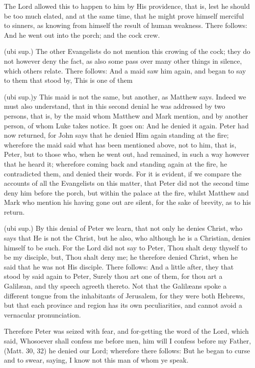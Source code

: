  The Lord allowed this to happen to him by His providence, that is, lest he should be too much elated, and at the same time, that he might prove himself merciful to sinners, as knowing from himself the result of human weakness. There follows: And he went out into the porch; and the cock crew.

 (ubi sup.) The other Evangelists do not mention this crowing of the cock; they do not however deny the fact, as also some pass over many other things in silence, which others relate. There follows: And a maid saw him again, and began to say to them that stood by, This is one of them

 (ubi sup.)y This maid is not the same, but another, as Matthew says. Indeed we must also understand, that in this second denial he was addressed by two persons, that is, by the maid whom Matthew and Mark mention, and by another person, of whom Luke takes notice. It goes on: And he denied it again. Peter had now returned, for John says that he denied Him again standing at the fire; wherefore the maid said what has been mentioned above, not to him, that is, Peter, but to those who, when he went out, had remained, in such a way however that he heard it; wherefore coming back and standing again at the fire, he contradicted them, and denied their words. For it is evident, if we compare the accounts of all the Evangelists on this matter, that Peter did not the second time deny him before the porch, but within the palace at the fire, whilst Matthew and Mark who mention his having gone out are silent, for the sake of brevity, as to his return.

 (ubi sup.) By this denial of Peter we learn, that not only he denies Christ, who says that He is not the Christ, but he also, who although he is a Christian, denies himself to be such. For the Lord did not say to Peter, Thou shalt deny thyself to be my disciple, but, Thou shalt deny me; he therefore denied Christ, when he said that he was not His disciple. There follows: And a little after, they that stood by said again to Peter, Surely thou art one of them, for thou art a Galilæan, and thy speech agreeth thereto. Not that the Galilæans spoke a different tongue from the inhabitants of Jerusalem, for they were both Hebrews, but that each province and region has its own peculiarities, and cannot avoid a vernacular pronunciation.

 Therefore Peter was seized with fear, and for-getting the word of the Lord, which said, Whosoever shall confess me before men, him will I confess before my Father, (Matt. 30, 32) he denied our Lord; wherefore there follows: But he began to curse and to swear, saying, I know not this man of whom ye speak.

